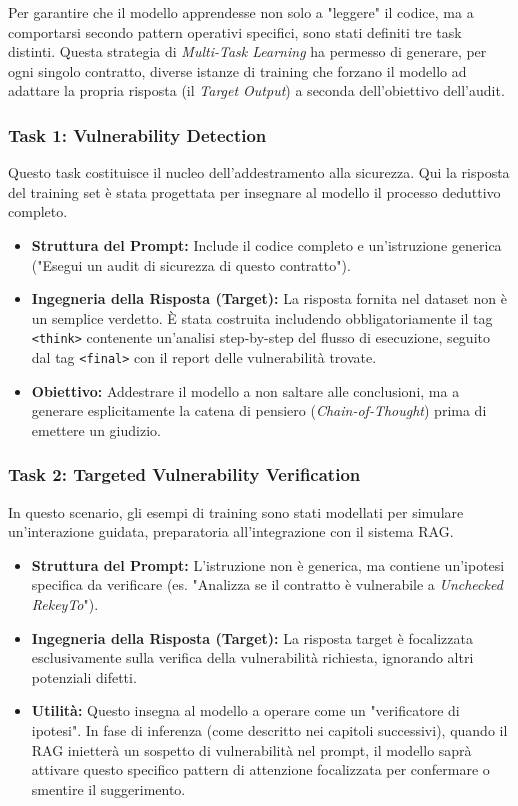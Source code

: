Per garantire che il modello apprendesse non solo a "leggere" il codice, ma a comportarsi secondo pattern operativi specifici, sono stati definiti tre task distinti. Questa strategia di \textit{Multi-Task Learning} ha permesso di generare, per ogni singolo contratto, diverse istanze di training che forzano il modello ad adattare la propria risposta (il \textit{Target Output}) a seconda dell'obiettivo dell'audit.

\subsubsection{Task 1: Vulnerability Detection}
Questo task costituisce il nucleo dell'addestramento alla sicurezza. Qui la risposta del training set è stata progettata per insegnare al modello il processo deduttivo completo.
\begin{itemize}
    \item \textbf{Struttura del Prompt:} Include il codice completo e un'istruzione generica ("Esegui un audit di sicurezza di questo contratto").
    \item \textbf{Ingegneria della Risposta (Target):} La risposta fornita nel dataset non è un semplice verdetto. È stata costruita includendo obbligatoriamente il tag \texttt{<think>} contenente un'analisi step-by-step del flusso di esecuzione, seguito dal tag \texttt{<final>} con il report delle vulnerabilità trovate.
    \item \textbf{Obiettivo:} Addestrare il modello a non saltare alle conclusioni, ma a generare esplicitamente la catena di pensiero (\textit{Chain-of-Thought}) prima di emettere un giudizio.
\end{itemize}

\subsubsection{Task 2: Targeted Vulnerability Verification}
In questo scenario, gli esempi di training sono stati modellati per simulare un'interazione guidata, preparatoria all'integrazione con il sistema RAG.
\begin{itemize}
    \item \textbf{Struttura del Prompt:} L'istruzione non è generica, ma contiene un'ipotesi specifica da verificare (es. "Analizza se il contratto è vulnerabile a \textit{Unchecked RekeyTo}").
    \item \textbf{Ingegneria della Risposta (Target):} La risposta target è focalizzata esclusivamente sulla verifica della vulnerabilità richiesta, ignorando altri potenziali difetti.
    \item \textbf{Utilità:} Questo insegna al modello a operare come un "verificatore di ipotesi". In fase di inferenza (come descritto nei capitoli successivi), quando il RAG inietterà un sospetto di vulnerabilità nel prompt, il modello saprà attivare questo specifico pattern di attenzione focalizzata per confermare o smentire il suggerimento.
\end{itemize}

